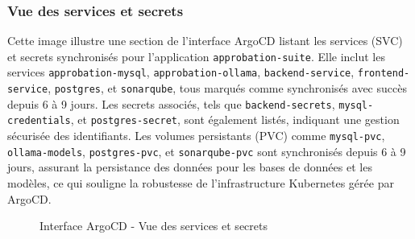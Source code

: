 \subsubsection{Vue des services et secrets}
Cette image illustre une section de l’interface ArgoCD listant les services (SVC) et secrets synchronisés pour l’application \texttt{approbation-suite}. Elle inclut les services \texttt{approbation-mysql}, \texttt{approbation-ollama}, \texttt{backend-service}, \texttt{frontend-service}, \texttt{postgres}, et \texttt{sonarqube}, tous marqués comme synchronisés avec succès depuis 6 à 9 jours. Les secrets associés, tels que \texttt{backend-secrets}, \texttt{mysql-credentials}, et \texttt{postgres-secret}, sont également listés, indiquant une gestion sécurisée des identifiants. Les volumes persistants (PVC) comme \texttt{mysql-pvc}, \texttt{ollama-models}, \texttt{postgres-pvc}, et \texttt{sonarqube-pvc} sont synchronisés depuis 6 à 9 jours, assurant la persistance des données pour les bases de données et les modèles, ce qui souligne la robustesse de l’infrastructure Kubernetes gérée par ArgoCD.
\newpage
\begin{figure}[h]
    \vspace*{-1.5cm}
    \begin{adjustwidth}{-3.5cm}{-3.5cm}
    \centering
    \caption{Interface ArgoCD - Vue des services et secrets}
    \label{fig:argo2}
    \end{adjustwidth}
\end{figure}
